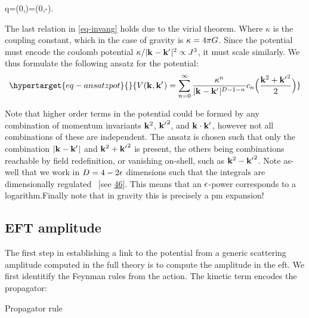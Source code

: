 \documentclass[
  10pt,
  a4paper,
  DIV=11,
  numbers=noendperiod,
  twoside]{scrreprt}
\let\[\relax \let\]\relax %
\DeclareRobustCommand{\[}{\begin{equation}}
\DeclareRobustCommand{\]}{\end{equation}}
\begin{document}
\[
q=(0,)=(0,-).
\]

The last relation in \ref{eq-invang} holds due to the virial theorem.
Where \(\kappa\) is the coupling constant, which in the case of gravity
is \(\kappa=4\pi G\). Since the potential must encode the coulomb
potential \(\kappa/\vert\mathbf{{k}}_{}-\mathbf{{k'}}_{} \vert^2\propto J^3\), it must scale
similarly. We thus formulate the following ansatz for the potential:
\begin{equation}\protect\hypertarget{eq-ansatzpot}{}{
\pot(\tv{k},\tv{k'})=\sum_{n=0}^\infty \frac{\kappa^n}{\abs{\tv{k}-\tv{k'}}^{\Dim-1-n}} c_n\pa[\Big]{\frac{\tv{k}^2+\tv{k'}^2}{2}}
}\label{eq-ansatzpot}\end{equation}

Note that higher order terms in the potential could be formed by any
combination of momentum invariants \(\mathbf{{k}}_{}^2\), \(\mathbf{{k'}}_{}^2\), and
\(\mathbf{{k}}_{}\cdot\mathbf{{k'}}_{}\), however not all combinations of these are
independent. The ansatz is chosen such that only the combination
\(\vert\mathbf{{k}}_{}-\mathbf{{k'}}_{} \vert\) and \(\mathbf{{k}}_{}^2+\mathbf{{k'}}_{}^2\) is present, the
others being combinations reachable by field redefinition, or vanishing
on-shell, such as \(\mathbf{{k}}_{}^2-\mathbf{{k'}}_{}^2\). Note as-well that we work in
\(D=4-2\epsilon\) dimensions such that the integrals are dimensionally
regulated ~{[}see \protect\hyperlink{ref-tHooft:1972tcz}{46}{]}. This
means that an \(\epsilon\)-power corresponds to a
logarithm.Finally
note that in gravity this is precisely a \gls{pm} expansion!

\hypertarget{eft-amplitude}{%
\subsection{EFT amplitude}\label{eft-amplitude}}

The first step in establishing a link to the potential from a generic
scattering amplitude computed in the full theory is to compute the
amplitude in the \gls{eft}. We first identitify the Feynman rules from
the action. The kinetic term encodes the propagator:

\hypertarget{fig-propagator}{}
{
\makeatletter
\def\LT@makecaption#1#2#3{%
  \noalign{\smash{\hbox{\kern\textwidth\rlap{\kern\marginparsep
  \parbox[t]{\marginparwidth}{%
    \footnotesize{%
      \vspace{(1.1\baselineskip)}
    #1{#2: }\ignorespaces #3}}}}}}%
    }
\makeatother



\label{fig-propagator}Propagator rule

}
\end{document}
